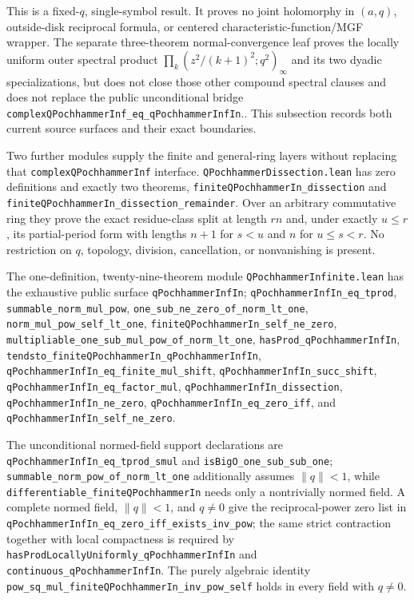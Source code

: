 \documentclass[11pt,oneside]{article}
\theoremstyle{definition}
\theoremstyle{remark}
\begin{document}
This is a fixed-\(q\), single-symbol result.  It proves no joint holomorphy in
\((a,q)\), outside-disk reciprocal formula, or centered characteristic-function/MGF
wrapper.  The separate three-theorem normal-convergence leaf proves the
locally uniform outer spectral product
\(\prod_k(z^2/(k+1)^2;q^2)_\infty\) and its two dyadic specializations, but
does not close those other compound spectral clauses and does not replace the
public unconditional bridge
\nolinkurl{complexQPochhammerInf_eq_qPochhammerInfIn}..
This subsection records both current source surfaces and their exact boundaries.

Two further modules supply the finite and general-ring layers without
replacing that \nolinkurl{complexQPochhammerInf} interface.
\nolinkurl{QPochhammerDissection.lean} has zero definitions and exactly two
theorems, \nolinkurl{finiteQPochhammerIn_dissection} and
\nolinkurl{finiteQPochhammerIn_dissection_remainder}.  Over an arbitrary
commutative ring they prove the exact residue-class split at length \(rn\)
and, under exactly \(u\le r\), its partial-period form with lengths \(n+1\)
for \(s<u\) and \(n\) for \(u\le s<r\).  No restriction on \(q\), topology,
division, cancellation, or nonvanishing is present.

The one-definition, twenty-nine-theorem module
\nolinkurl{QPochhammerInfinite.lean} has the exhaustive public surface
\nolinkurl{qPochhammerInfIn};
\nolinkurl{qPochhammerInfIn_eq_tprod},
\nolinkurl{summable_norm_mul_pow},
\nolinkurl{one_sub_ne_zero_of_norm_lt_one},
\nolinkurl{norm_mul_pow_self_lt_one},
\nolinkurl{finiteQPochhammerIn_self_ne_zero},
\nolinkurl{multipliable_one_sub_mul_pow_of_norm_lt_one},
\nolinkurl{hasProd_qPochhammerInfIn},
\nolinkurl{tendsto_finiteQPochhammerIn_qPochhammerInfIn},
\nolinkurl{qPochhammerInfIn_eq_finite_mul_shift},
\nolinkurl{qPochhammerInfIn_succ_shift},
\nolinkurl{qPochhammerInfIn_eq_factor_mul},
\nolinkurl{qPochhammerInfIn_dissection},
\nolinkurl{qPochhammerInfIn_ne_zero},
\nolinkurl{qPochhammerInfIn_eq_zero_iff}, and
\nolinkurl{qPochhammerInfIn_self_ne_zero}.

The unconditional normed-field support declarations are
\nolinkurl{qPochhammerInfIn_eq_tprod_smul} and
\nolinkurl{isBigO_one_sub_sub_one};
\nolinkurl{summable_norm_pow_of_norm_lt_one} additionally assumes
\(\lVert q\rVert<1\), while
\nolinkurl{differentiable_finiteQPochhammerIn} needs only a nontrivially
normed field.  A complete normed field, \(\lVert q\rVert<1\), and \(q\ne0\)
give the reciprocal-power
zero list in
\nolinkurl{qPochhammerInfIn_eq_zero_iff_exists_inv_pow}; the same strict
contraction together with local compactness is required by
\nolinkurl{hasProdLocallyUniformly_qPochhammerInfIn} and
\nolinkurl{continuous_qPochhammerInfIn}.  The purely algebraic identity
\nolinkurl{pow_sq_mul_finiteQPochhammerIn_inv_pow_self} holds in every field
with \(q\ne0\).
\end{document}
